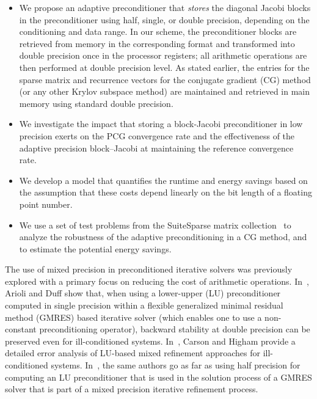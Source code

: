 \begin{itemize} \item We propose an adaptive preconditioner that {\em stores}
	the diagonal Jacobi blocks in the preconditioner using half, single, or 
	double
	precision, depending on the conditioning and data range. In our scheme, the
	preconditioner blocks are retrieved from memory in the corresponding format 
	and
	transformed into double precision once in the processor registers; all
	arithmetic operations are then performed at double precision level. As 
	stated
	earlier, the entries for the sparse matrix and recurrence vectors for the 
	conjugate gradient (CG)
	method (or any other Krylov subspace method) are maintained and retrieved 
	in main
	memory using standard double precision.
	\item We investigate the impact that
	storing a block-Jacobi preconditioner in low precision exerts on the PCG
	convergence rate and the effectiveness of the adaptive precision 
	block--Jacobi
        at maintaining the reference convergence rate.
	\item We develop a model that quantifies the runtime and energy savings 
	based on
	the assumption that these costs depend linearly on the bit length of a 
	floating
	point number. 
	\item We use a set of test problems from the SuiteSparse matrix
	collection~\cite{ufmc} to analyze the robustness of the adaptive
	preconditioning in a CG method, and to estimate the potential energy 
	savings. 
\end{itemize}

The use of mixed precision in preconditioned iterative solvers was previously 
explored with a primary focus on reducing the cost of arithmetic operations.
In~\cite{Arioli2008}, Arioli and Duff show that, when using a lower-upper (LU) 
preconditioner
computed in single precision within a flexible generalized minimal residual 
method (GMRES) 
based iterative solver (which enables one to use a non-constant preconditioning 
operator), backward stability at double precision can be preserved even for 
ill-conditioned systems. In~\cite{carson1}, Carson and Higham provide a 
detailed 
error analysis of LU-based mixed refinement approaches for ill-conditioned 
systems.
In~\cite{carson2}, the same authors go as far as using half precision for
computing an LU preconditioner that is used in the solution process of a GMRES
solver that is part of a mixed precision iterative refinement process.

